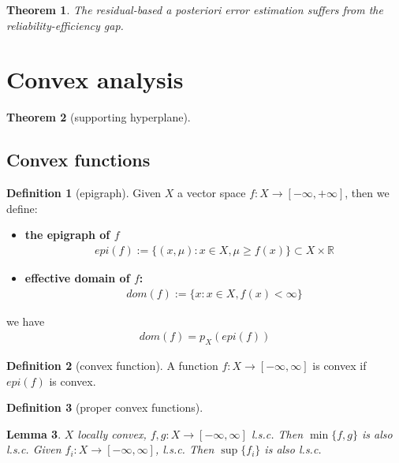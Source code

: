 \documentclass[a4paper,12pt,oneside,fleqn]{book}
\newtheorem{theorem}{Theorem}[section]
\newtheorem{lemma}[theorem]{Lemma}
\theoremstyle{definition}
\newtheorem{definition}{Definition}[section]
\theoremstyle{remark}
\begin{document}
\begin{theorem}
	The residual-based a posteriori error estimation suffers from the reliability-efficiency gap. 
\end{theorem}

\section{Convex analysis}
\begin{theorem}[supporting hyperplane]
\end{theorem}

\subsection{Convex functions}
\begin{definition}[epigraph]
	Given $X$ a vector space $f:X \rightarrow [-\infty, + \infty]$, then we define:
	\begin{itemize}
		\item \textbf{the epigraph of $f$}
			\begin{align*}
				epi(f):= \{(x, \mu): x \in X, \mu \geq f(x) \} \subset X \times \mathbb{R}
			\end{align*}
		\item \textbf{effective domain of $f$:}
			\begin{align*}
				dom(f):= \{ x: x \in X, f(x) < \infty \}
			\end{align*}
	\end{itemize}
	we have 
	\begin{align*}
		dom(f) = p_X(epi(f))
	\end{align*}
\end{definition}

\begin{definition}[convex function]
	A function $f: X \rightarrow [-\infty, \infty]$ is convex if $epi(f)$ is convex. 
\end{definition}

\begin{definition}[proper convex functions]
	
\end{definition}

\begin{lemma}
	$X$ locally convex, $f, g:X \rightarrow [-\infty, \infty]$ l.s.c. Then $\min\{f, g\}$ is also l.s.c. Given $f_i: X \rightarrow [-\infty, \infty]$, l.s.c. Then $\sup\{f_i\}$ is also l.s.c. 
\end{lemma}
\end{document}
